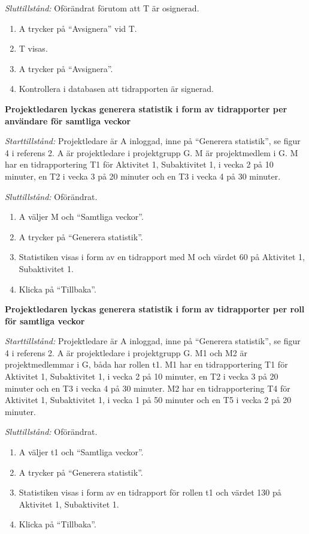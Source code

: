 \documentclass[a4paper]{article}
\begin{document}
\begin{FT}
\emph{Sluttillstånd:} Oförändrat förutom att T är osignerad.

\begin{enumerate}
\item A trycker på ``Avsignera'' vid T.
\item T visas.
\item A trycker på ``Avsignera''.
\item Kontrollera i databasen att tidrapporten är signerad.
\end{enumerate}



\item
\textbf{Projektledaren lyckas generera statistik i form av tidrapporter per användare för samtliga veckor}

\emph{Starttillstånd:} Projektledare är A inloggad, inne på ``Generera statistik'', se figur 4 i referens 2. A är projektledare i projektgrupp G. M är projektmedlem i G. M har en tidrapportering T1 för Aktivitet 1, Subaktivitet 1, i vecka 2 på 10 minuter, en T2 i vecka 3 på 20 minuter och en T3 i vecka 4 på 30 minuter. 

\emph{Sluttillstånd:} Oförändrat.

\begin{enumerate}
\item A väljer M och ``Samtliga veckor''.
\item A trycker på ``Generera statistik''.
\item Statistiken visas i form av en tidrapport med M och värdet 60 på Aktivitet 1, Subaktivitet 1.
\item Klicka på ``Tillbaka''.
\end{enumerate}



\item
\textbf{Projektledaren lyckas generera statistik i form av tidrapporter per roll för samtliga veckor}

\emph{Starttillstånd:} Projektledare är A inloggad, inne på ``Generera statistik'', se figur 4 i referens 2. A är projektledare i projektgrupp G. M1 och M2 är projektmedlemmar i G, båda har rollen t1. M1 har en tidrapportering T1 för Aktivitet 1, Subaktivitet 1, i vecka 2 på 10 minuter, en T2 i vecka 3 på 20 minuter och en T3 i vecka 4 på 30 minuter. M2 har en tidrapportering T4 för Aktivitet 1, Subaktivitet 1, i vecka 1 på 50 minuter och en T5 i vecka 2 på 20 minuter.

\emph{Sluttillstånd:} Oförändrat.

\begin{enumerate}
\item A väljer t1 och ``Samtliga veckor''.
\item A trycker på ``Generera statistik''.
\item Statistiken visas i form av en tidrapport för rollen t1 och värdet 130 på Aktivitet 1, Subaktivitet 1.
\item Klicka på ``Tillbaka''.
\end{enumerate}



\end{FT}
\end{document}
